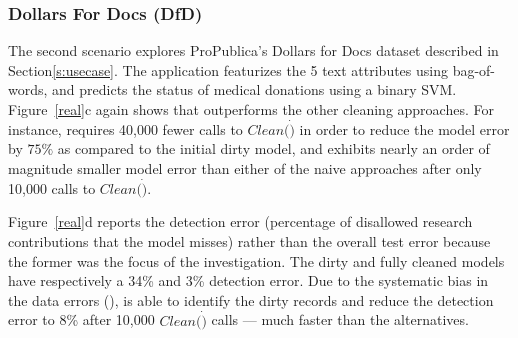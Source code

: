 

\subsubsection{Dollars For Docs (DfD)}\label{exp:dfd}

The second scenario explores ProPublica's Dollars for Docs dataset described in Section\ref{s:usecase}.
The application featurizes the 5 text attributes using bag-of-words, and predicts the status of medical donations using a binary SVM.
Figure~\ref{real}c again shows that \sys outperforms the other cleaning approaches.
For instance, \sys requires 40,000 fewer calls to $Clean(\dot)$ in order to reduce the model error by $75\%$ as compared to the initial dirty model,
and exhibits nearly an order of magnitude smaller model error than either of the naive approaches after only 10,000 calls to $Clean(\dot)$.

Figure~\ref{real}d reports the detection error (percentage of disallowed research contributions that the model misses) rather than the overall test error because the former was the focus of the investigation.  The dirty and fully cleaned models have respectively a 34\% and 3\% detection error.
Due to the systematic bias in the data errors (), \sys is able to identify the dirty records and
reduce the detection error to 8\% after 10,000 $Clean(\dot)$ calls --- much faster than the alternatives.

